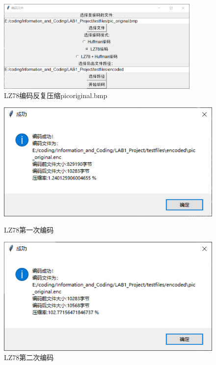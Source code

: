 \documentclass[12pt, a4paper]{ctexart}
\begin{document}
    \begin{figure}[H]
    \centering
    \includegraphics[width=10cm]{./pic/12-0.png}		
    \caption{LZ78编码反复压缩picoriginal.bmp}
    \end{figure}
    
    \begin{figure}[H]
    \centering
    \begin{minipage}[t]{0.45\textwidth}
    \centering
    \includegraphics[width=\textwidth]{./pic/12-1.png}
    \caption{LZ78第一次编码}
    \end{minipage}
    \hfill
    \begin{minipage}[t]{0.45\textwidth}
    \centering
    \includegraphics[width=\textwidth]{./pic/12-2.png}
    \caption{LZ78第二次编码}
    \end{minipage}
    \end{figure}
\end{document}
